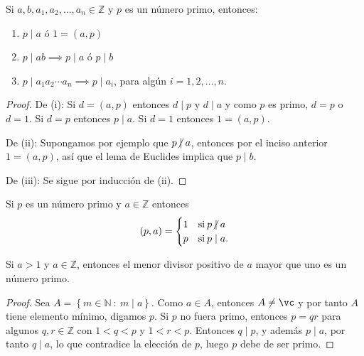 \begin{proposition}
Si $a,b,a_1,a_2,\ldots ,a_n\in \mathbb{Z}$ y $p$ es un número primo, entonces:

\begin{enumerate}[label=\textnormal{(\roman*)}]
	\item $p \mid a$ ó $1=(a,p)$
	\item $p \mid a b \implies p \mid a$ ó $p \mid b$
	\item $p \mid a_1 a_2 \cdots a_n \implies p \mid a_i$, para algún $i=1,2,\ldots ,n$.
\end{enumerate}
\begin{proof}
De (i): Si $d=(a,p)$ entonces $d \mid p$ y $d \mid a$ y como $p$ es primo, $d=p$ o $d=1$. Si $d=p$ entonces $p \mid a$. Si $d=1$ entonces $1=(a,p)$.
\bigskip

De (ii): Supongamos por ejemplo que $p \centernot\mid a$, entonces por el inciso anterior $1=(a,p)$, así que el lema de Euclides implica que $p \mid b$.
\bigskip

De (iii): Se sigue por inducción de (ii).
\end{proof}
\end{proposition}

\begin{corollary}
Si $p$ es un número primo y $a\in \mathbb{Z}$ entonces 
\begin{equation*}
	(p,a) =
		\begin{cases}
			1 & \text{si} \: p \centernot\mid a \\ %
			p & \text{si} \: p \mid a.
		\end{cases}
\end{equation*}
\end{corollary}


\begin{lemma}\label{lemma:pr1}
Si $a>1$ y $a\in \mathbb{Z}$, entonces el menor divisor positivo de $a$ mayor que uno es un número primo.
\end{lemma}
\begin{proof}
Sea $A=\left\{m\in\mathbb{N} \: : \: m \mid a\right\}$. Como $a\in A$, entonces $A\neq\vc$ y por tanto $A$ tiene elemento mínimo, digamos $p$. Si $p$ no fuera primo, entonces $p=qr$ para algunos $q,r\in \mathbb{Z}$ con $1<q<p$ y $1<r<p$. Entonces $q \mid p$, y además $p \mid a$, por tanto $q \mid a$, lo que contradice la elección de $p$, luego $p$ debe de ser primo.
\end{proof}


